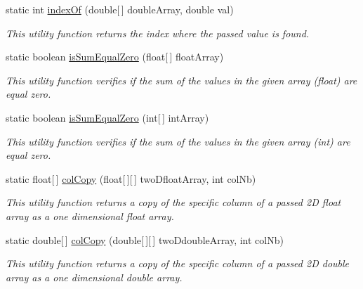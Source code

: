 \begin{DoxyCompactItemize}
static int \hyperlink{classuk_1_1ac_1_1dmu_1_1iesd_1_1cascade_1_1util_1_1_array_utils_ad6169909480482f00f765f9675a5e513}{index\-Of} (double\mbox{[}$\,$\mbox{]} double\-Array, double val)
\begin{DoxyCompactList}\small\item\em This utility function returns the index where the passed value is found. \end{DoxyCompactList}\item 
static boolean \hyperlink{classuk_1_1ac_1_1dmu_1_1iesd_1_1cascade_1_1util_1_1_array_utils_a23db3a5cb5ae703e9842e113e1c3ff7f}{is\-Sum\-Equal\-Zero} (float\mbox{[}$\,$\mbox{]} float\-Array)
\begin{DoxyCompactList}\small\item\em This utility function verifies if the sum of the values in the given array (float) are equal zero. \end{DoxyCompactList}\item 
static boolean \hyperlink{classuk_1_1ac_1_1dmu_1_1iesd_1_1cascade_1_1util_1_1_array_utils_a3c7ced4fd47d36f31a5c8a506fe408b7}{is\-Sum\-Equal\-Zero} (int\mbox{[}$\,$\mbox{]} int\-Array)
\begin{DoxyCompactList}\small\item\em This utility function verifies if the sum of the values in the given array (int) are equal zero. \end{DoxyCompactList}\item 
static float\mbox{[}$\,$\mbox{]} \hyperlink{classuk_1_1ac_1_1dmu_1_1iesd_1_1cascade_1_1util_1_1_array_utils_acd09574fdde2b68964c0dcdf79f1d4fa}{col\-Copy} (float\mbox{[}$\,$\mbox{]}\mbox{[}$\,$\mbox{]} two\-Dfloat\-Array, int col\-Nb)
\begin{DoxyCompactList}\small\item\em This utility function returns a copy of the specific column of a passed 2\-D float array as a one dimensional float array. \end{DoxyCompactList}\item 
static double\mbox{[}$\,$\mbox{]} \hyperlink{classuk_1_1ac_1_1dmu_1_1iesd_1_1cascade_1_1util_1_1_array_utils_a4a36eed41a404b1301705710eae77546}{col\-Copy} (double\mbox{[}$\,$\mbox{]}\mbox{[}$\,$\mbox{]} two\-Ddouble\-Array, int col\-Nb)
\begin{DoxyCompactList}\small\item\em This utility function returns a copy of the specific column of a passed 2\-D double array as a one dimensional double array. \end{DoxyCompactList}\item 

\end{DoxyCompactItemize}

